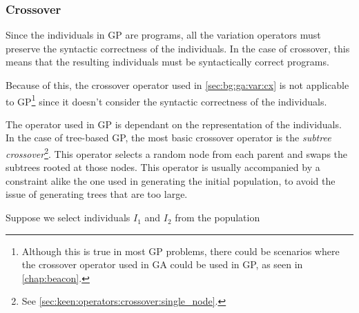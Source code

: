 \subsubsection{Crossover}
\label{sec:bg:gp:variation:crossover}
  Since the individuals in GP are programs, all the variation operators must
  preserve the syntactic correctness of the individuals.
  In the case of crossover, this means that the resulting individuals must be
  syntactically correct programs.
  
  Because of this, the crossover operator used in \vref{sec:bg:ga:var:cx} is not
  applicable to GP\footnote{%
    Although this is true in most GP problems, there could be scenarios where
    the crossover operator used in GA could be used in GP, as seen in
    \vref{chap:beacon}.
  } since it doesn't consider the syntactic correctness of the individuals.

  The operator used in GP is dependant on the representation of the individuals.
  In the case of tree-based GP, the most basic crossover operator is the
  \emph{subtree crossover}\footnote{%
    See \vref{sec:keen:operators:crossover:single_node}.
  }.
  This operator selects a random node from each parent and swaps the subtrees
  rooted at those nodes.
  This operator is usually accompanied by a constraint alike the one used in
  generating the initial population, to avoid the issue of generating trees that
  are too large.

  Suppose we select individuals \(I_1\) and \(I_2\) from the population